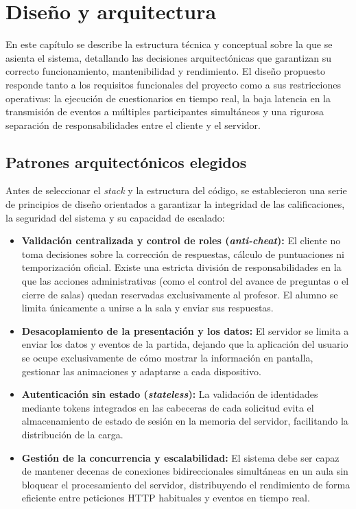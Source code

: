 \chapter{Diseño y arquitectura}\label{cap:diseno_y_arquitectura}

En este capítulo se describe la estructura técnica y conceptual sobre la que se asienta el sistema, detallando las decisiones arquitectónicas que garantizan su correcto funcionamiento, mantenibilidad y rendimiento. El diseño propuesto responde tanto a los requisitos funcionales del proyecto como a sus restricciones operativas: la ejecución de cuestionarios en tiempo real, la baja latencia en la transmisión de eventos a múltiples participantes simultáneos y una rigurosa separación de responsabilidades entre el cliente y el servidor.

\section{Patrones arquitectónicos elegidos}

Antes de seleccionar el \textit{stack} y la estructura del código, se establecieron una serie de principios de diseño orientados a garantizar la integridad de las calificaciones, la seguridad del sistema y su capacidad de escalado:

\begin{itemize}
    \item \textbf{Validación centralizada y control de roles (\textit{anti-cheat}):} El cliente no toma decisiones sobre la corrección de respuestas, cálculo de puntuaciones ni temporización oficial. Existe una estricta división de responsabilidades en la que las acciones administrativas (como el control del avance de preguntas o el cierre de salas) quedan reservadas exclusivamente al profesor. El alumno se limita únicamente a unirse a la sala y enviar sus respuestas.   
    \item \textbf{Desacoplamiento de la presentación y los datos:} El servidor se limita a enviar los datos y eventos de la partida, dejando que la aplicación del usuario se ocupe exclusivamente de cómo mostrar la información en pantalla, gestionar las animaciones y adaptarse a cada dispositivo.
    \item \textbf{Autenticación sin estado (\textit{stateless}):} La validación de identidades mediante tokens integrados en las cabeceras de cada solicitud evita el almacenamiento de estado de sesión en la memoria del servidor, facilitando la distribución de la carga.
    \item \textbf{Gestión de la concurrencia y escalabilidad:} El sistema debe ser capaz de mantener decenas de conexiones bidireccionales simultáneas en un aula sin bloquear el procesamiento del servidor, distribuyendo el rendimiento de forma eficiente entre peticiones HTTP habituales y eventos en tiempo real.
\end{itemize}

